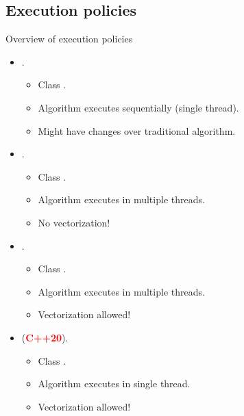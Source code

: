 \subsection{Execution policies}

\begin{frame}[t]{Overview of execution policies}
\vspace{-1em}
\begin{itemize}
  \item {}.
    \begin{itemize}
      \item Class .
      \item Algorithm executes sequentially (single thread).
      \item Might have changes over traditional algorithm.
    \end{itemize}
\pause
  \item {}.
    \begin{itemize}
      \item Class .
      \item Algorithm executes in multiple threads.
      \item No vectorization!
    \end{itemize}
\pause
  \item {}.
    \begin{itemize}
      \item Class .
      \item Algorithm executes in multiple threads.
      \item Vectorization allowed!
    \end{itemize}
\pause
  \item {} (\textbf{\textcolor{red}{C++20}}).
    \begin{itemize}
      \item Class .
      \item Algorithm executes in single thread.
      \item Vectorization allowed!
    \end{itemize}
\end{itemize}
\end{frame}

